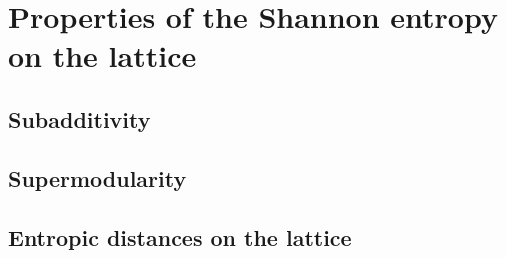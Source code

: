 \section{Properties of the Shannon entropy on the lattice}

\subsection{Subadditivity}



\subsection{Supermodularity}



\subsection{Entropic distances on the lattice}

